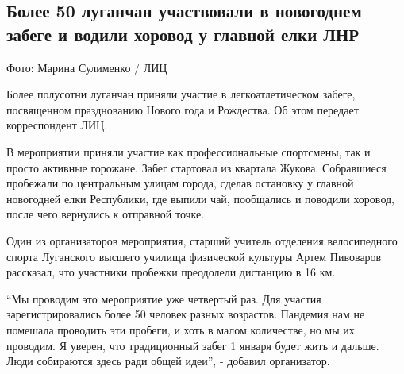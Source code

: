  
 
 
 
 
\subsection{Более 50 луганчан участвовали в новогоднем забеге и водили хоровод у главной елки ЛНР}
\label{sec:01_01_2022.stz.news.lnr.lug_info.1.zabeg}


Фото: Марина Сулименко / ЛИЦ

Более полусотни луганчан приняли участие в легкоатлетическом забеге,
посвященном празднованию Нового года и Рождества. Об этом передает
корреспондент ЛИЦ.


В мероприятии приняли участие как профессиональные спортсмены, так и просто
активные горожане. Забег стартовал из квартала Жукова. Собравшиеся пробежали по
центральным улицам города, сделав остановку у главной новогодней елки
Республики, где выпили чай, пообщались и поводили хоровод, после чего вернулись
к отправной точке.


Один из организаторов мероприятия, старший учитель отделения велосипедного
спорта Луганского высшего училища физической культуры Артем Пивоваров
рассказал, что участники пробежки преодолели дистанцию в 16 км.  


\enquote{Мы проводим это мероприятие уже четвертый раз. Для участия зарегистрировались
более 50 человек разных возрастов. Пандемия нам не помешала проводить эти
пробеги, и хоть в малом количестве, но мы их проводим. Я уверен, что
традиционный забег 1 января будет жить и дальше. Люди собираются здесь ради
общей идеи}, - добавил организатор.

